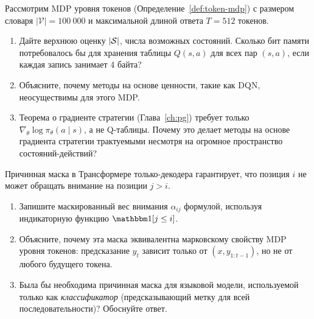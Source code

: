 \begin{exercise}
\label{ex:token-mdp-size}
Рассмотрим MDP уровня токенов (Определение~\ref{def:token-mdp}) с размером словаря $|\mathcal{V}| = 100~000$ и максимальной длиной ответа $T = 512$ токенов.
\begin{enumerate}
  \item Дайте верхнюю оценку $|\mathcal{S}|$, числа возможных состояний. Сколько бит памяти потребовалось бы для хранения таблицы $Q(s, a)$ для всех пар $(s, a)$, если каждая запись занимает 4 байта?
  \item Объясните, почему методы на основе ценности, такие как DQN, неосуществимы для этого MDP.
  \item Теорема о градиенте стратегии (Глава~\ref{ch:pg}) требует только $\nabla_\theta \log \pi_\theta(a \mid s)$, а не Q-таблицы. Почему это делает методы на основе градиента стратегии трактуемыми несмотря на огромное пространство состояний-действий?
\end{enumerate}
\end{exercise}

\begin{exercise}
\label{ex:causal-mask}
Причинная маска в Трансформере только-декодера гарантирует, что позиция $i$ не может обращать внимание на позиции $j > i$.
\begin{enumerate}
  \item Запишите маскированный вес внимания $\alpha_{ij}$ формулой, используя индикаторную функцию $\ind[j \leq i]$.
  \item Объясните, почему эта маска эквивалентна марковскому свойству MDP уровня токенов: предсказание $y_t$ зависит только от $(x, y_{1:t-1})$, но не от любого будущего токена.
  \item Была бы необходима причинная маска для языковой модели, используемой только как \emph{классификатор} (предсказывающий метку для всей последовательности)? Обоснуйте ответ.
\end{enumerate}
\end{exercise}

